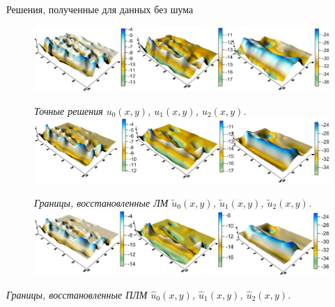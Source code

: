 \documentclass[10pt,pdf, mathserif, hyperref={unicode}]{beamer}
\begin{document}
\begin{frame}{Решения, полученные для данных без шума}
	\begin{figure}
		\centering
		\includegraphics[height=0.2\textheight]{exact_hor}

		\centering\textit{Точные решения $u_0(x,y)$, $u_1(x,y)$, $u_2(x,y)$.}
		\includegraphics[height=0.2\textheight]{levmar}

		\centering\textit{Границы, восстановленные ЛМ $\tilde{u}_0(x,y)$, $\tilde{u}_1(x,y)$, $\tilde{u}_2(x,y)$.}
		\centering
		\includegraphics[height=0.2\textheight]{clm}
	\end{figure}
	\centering\textit{Границы, восстановленные ПЛМ $\hat{u}_0(x,y)$, $\hat{u}_1(x,y)$, $\hat{u}_2(x,y)$.}

\end{frame}
\end{document}
